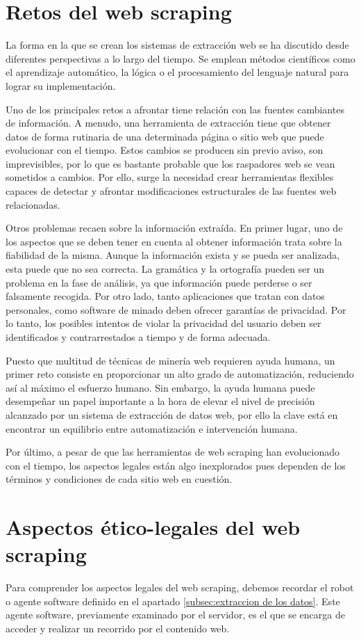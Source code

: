 \section{Retos del web scraping}
\label{sec:retos del web scraping}
La forma en la que se crean los sistemas de extracción web se ha discutido desde diferentes perspectivas
a lo largo del tiempo. Se emplean métodos científicos como el aprendizaje automático, la lógica o el
procesamiento del lenguaje natural para lograr su implementación.

Uno de los principales retos a afrontar tiene relación con las fuentes cambiantes de información. A menudo,
una herramienta de extracción tiene que obtener datos de forma rutinaria de una determinada página o sitio
web que puede evolucionar con el tiempo. Estos cambios se producen sin previo aviso, son imprevisibles,
por lo que es bastante probable que los raspadores web se vean sometidos a cambios. Por ello, surge la
necesidad crear herramientas flexibles capaces de detectar y afrontar modificaciones estructurales de las
fuentes web relacionadas.

Otros problemas recaen sobre la información extraída. En primer lugar, uno de los aspectos que se deben
tener en cuenta al obtener información trata sobre la fiabilidad de la misma. Aunque la información
exista y se pueda ser analizada, esta puede que no sea correcta. La gramática y la ortografía pueden ser
un problema en la fase de análisis, ya que información puede perderse o ser falsamente recogida. Por otro
lado, tanto aplicaciones que tratan con datos personales, como software de minado deben ofrecer garantías
de privacidad. Por lo tanto, los posibles intentos de violar la privacidad del usuario deben ser
identificados y contrarrestados a tiempo y de forma adecuada.

Puesto que multitud de técnicas de minería web requieren ayuda humana, un primer reto consiste en
proporcionar un alto grado de automatización, reduciendo así al máximo el esfuerzo humano. Sin embargo,
la ayuda humana puede desempeñar un papel importante a la hora de elevar el nivel de precisión alcanzado
por un sistema de extracción de datos web, por ello la clave está en encontrar un equilibrio entre
automatización e intervención humana.

Por último, a pesar de que las herramientas de web scraping han evolucionado con el tiempo, los aspectos
legales están algo inexplorados pues dependen de los términos y condiciones de cada sitio web en cuestión.

\section{Aspectos ético-legales del web scraping}
\label{sec:aspectos etico-legales del web scraping}
Para comprender los aspectos legales del web scraping, debemos recordar el robot o agente software
definido en el apartado \ref{subsec:extraccion de los datos}. Este agente software,
previamente examinado por el servidor, es el que se encarga de acceder y realizar un recorrido por el
contenido web.

